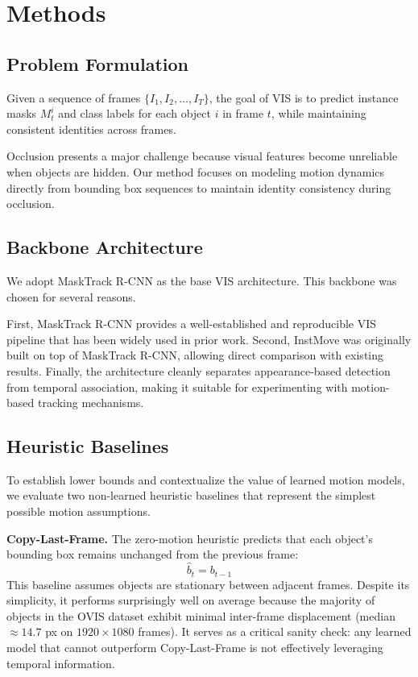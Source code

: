 \documentclass{article}
\begin{document}
\section{Methods}

\subsection{Problem Formulation}

Given a sequence of frames $\{I_1, I_2, \ldots, I_T\}$, the goal of VIS is to predict instance masks $M_t^i$ and class labels for each object $i$ in frame $t$, while maintaining consistent identities across frames.

Occlusion presents a major challenge because visual features become unreliable when objects are hidden. Our method focuses on modeling motion dynamics directly from bounding box sequences to maintain identity consistency during occlusion.

\subsection{Backbone Architecture}

We adopt MaskTrack R-CNN \cite{yang2019masktrack} as the base VIS architecture. This backbone was chosen for several reasons.

First, MaskTrack R-CNN provides a well-established and reproducible VIS pipeline that has been widely used in prior work. Second, InstMove was originally built on top of MaskTrack R-CNN, allowing direct comparison with existing results. Finally, the architecture cleanly separates appearance-based detection from temporal association, making it suitable for experimenting with motion-based tracking mechanisms.

\subsection{Heuristic Baselines}

To establish lower bounds and contextualize the value of learned motion models, we evaluate two non-learned heuristic baselines that represent the simplest possible motion assumptions.

\textbf{Copy-Last-Frame.} The zero-motion heuristic predicts that each object's bounding box remains unchanged from the previous frame:
\[
\hat{b}_t = b_{t-1}
\]
This baseline assumes objects are stationary between adjacent frames. Despite its simplicity, it performs surprisingly well on average because the majority of objects in the OVIS dataset exhibit minimal inter-frame displacement (median $\approx 14.7$ px on $1920 \times 1080$ frames). It serves as a critical sanity check: any learned model that cannot outperform Copy-Last-Frame is not effectively leveraging temporal information.
\end{document}
